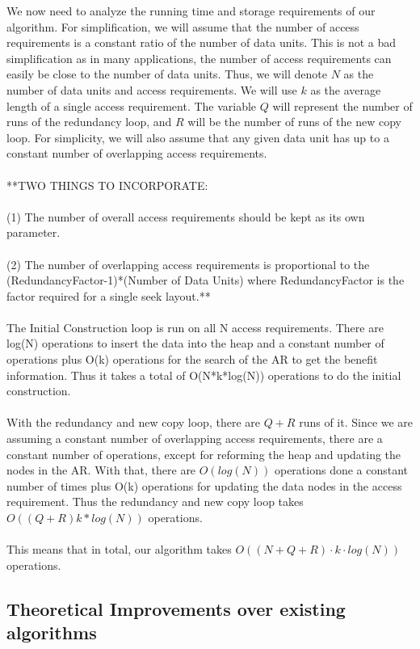 \documentclass[11pt,psfig]{article}
\begin{document}
We now need to analyze the running time and storage requirements of our algorithm. For simplification, we will assume that the number of access requirements is a constant ratio of the number of data units. This is not a bad simplification as in many applications, the number of access requirements can easily be close to the number of data units. Thus, we will denote $N$ as the number of data units and access requirements. We will use $k$ as the average length of a single access requirement. The variable $Q$ will represent the number of runs of the redundancy loop, and $R$ will be the number of runs of the new copy loop. For simplicity, we will also assume that any given data unit has up to a constant number of overlapping access requirements. \\
\\
**TWO THINGS TO INCORPORATE:\\
\\
(1) The number of overall access requirements should be kept as its own parameter. \\
\\
(2) The number of overlapping access requirements is proportional to the (RedundancyFactor-1)*(Number of Data Units) where RedundancyFactor is the factor required for a single seek layout.**\\
\\
The Initial Construction loop is run on all N access requirements. There are log(N) operations to insert the data into the heap and a constant number of operations plus O(k) operations for the search of the AR to get the benefit information. Thus it takes a total of O(N*k*log(N)) operations to do the initial construction. \\
\\
With the redundancy and new copy loop, there are $Q+R$ runs of it. Since we are assuming a constant number of overlapping access requirements, there are a constant number of operations, except for reforming the heap and updating the nodes in the AR. With that, there are $O(log(N))$ operations done a constant number of times plus O(k) operations for updating the data nodes in the access requirement. Thus the redundancy and new copy loop takes $O((Q+R)k*log(N))$ operations. \\
\\
This means that in total, our algorithm takes $O( (N + Q + R) \cdot k \cdot log(N))$ operations. 

\subsection*{Theoretical Improvements over existing algorithms}
\end{document}
